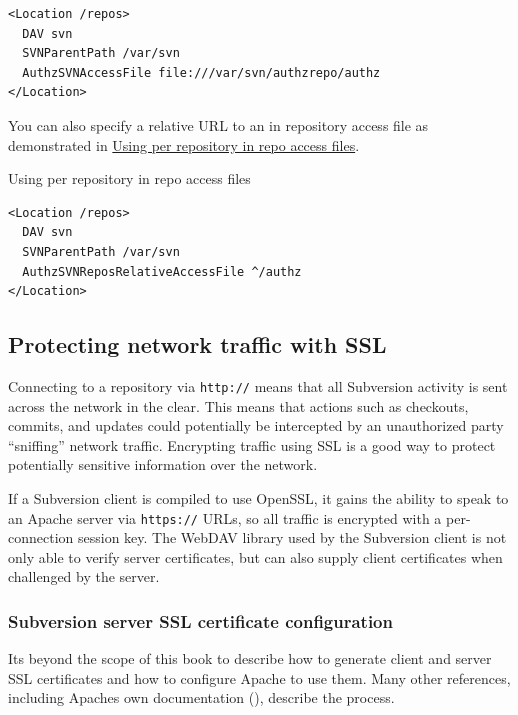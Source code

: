 \begin{verbatim}
<Location /repos>
  DAV svn
  SVNParentPath /var/svn
  AuthzSVNAccessFile file:///var/svn/authzrepo/authz
</Location>
\end{verbatim}

You can also specify a relative URL to an in repository access file as
demonstrated in
\hyperref[svn.serverconfig.httpd.authz.inrepo-authz.ex-2]{Using per
repository in repo access files}.

\protect{}\label{svn.serverconfig.httpd.authz.inrepo-authz.ex-2}
Using per repository in repo access files

\begin{verbatim}
<Location /repos>
  DAV svn
  SVNParentPath /var/svn
  AuthzSVNReposRelativeAccessFile ^/authz
</Location>
\end{verbatim}

\subsection{Protecting network traffic with
SSL}\label{svn.serverconfig.httpd.ssl}

Connecting to a repository via \texttt{http://} means that all
Subversion activity is sent across the network in the clear. This means
that actions such as checkouts, commits, and updates could potentially
be intercepted by an unauthorized party ``sniffing'' network traffic.
Encrypting traffic using SSL is a good way to protect potentially
sensitive information over the network.

If a Subversion client is compiled to use OpenSSL, it gains the ability
to speak to an Apache server via \texttt{https://} URLs, so all traffic
is encrypted with a per-connection session key. The WebDAV library used
by the Subversion client is not only able to verify server certificates,
but can also supply client certificates when challenged by the server.

\subsubsection{Subversion server SSL certificate
configuration}\label{svn.serverconfig.httpd.ssl.server}

It\textquotesingle s beyond the scope of this book to describe how to
generate client and server SSL certificates and how to configure Apache
to use them. Many other references, including Apache\textquotesingle s
own documentation (\href{https://httpd.apache.org/docs/current/ssl/}{}),
describe the process.

